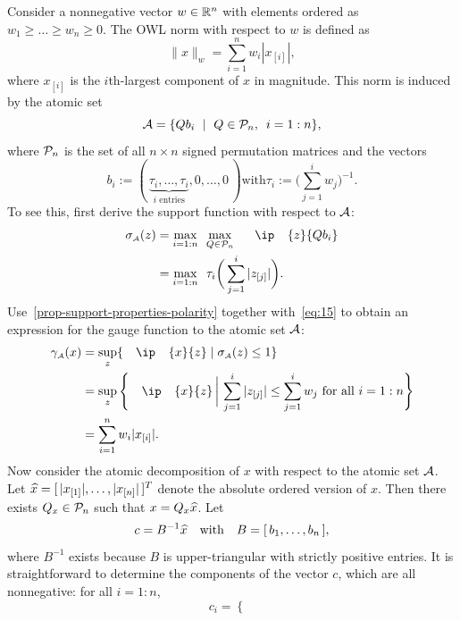 \begin{example}
  Consider a nonnegative vector $w \in \mathbb{R}^n$ with elements ordered as $w_1
  \geq \dots \geq w_n \geq 0$. The OWL norm with respect to $w$ is defined as 
  \begin{equation*}
    \|x\|_w = \sum_{i = 1}^n w_i|x_{[i]}|,
  \end{equation*}
  where $x_{[i]}$ is the $i$th-largest component of $x$ in magnitude. This norm
  is induced by the atomic set 
  \[
    \mathcal{A} = \{Qb_i ~\mid~ Q \in \mathcal{P}_n, \enspace i = 1:n\},
  \]
  where $\mathcal{P}_n$ is the set of all $n\times n$ signed permutation matrices and
  the vectors
  \[
    b_i :=
    (\,\underbrace{\tau_i, \dots, \tau_i}_{\mbox{$i$ entries}}, 0, \dots, 0\,)
    \text{with}
    \tau_i := \bigg(\sum_{j = 1}^i w_j\bigg)^{-1}.
  \]
  To see this, first derive the support function with respect to $\mathcal{A}$:
  \begin{align*}
    \sigma\As(z) &= \max_{i = 1:n}\enspace\max_{Q \in \Pscr_n}\enspace\ip{z}{Qb_i}
    \\&= \max_{i = 1:n}\enspace\tau_i\bigg(\sum_{j = 1}^i |z_{[j]}| \bigg).
  \end{align*}
  Use~\autoref{prop-support-properties-polarity} together with~\eqref{eq:15} to
  obtain an expression for the gauge function to the atomic set $\mathcal{A}$: 
  \begin{align*}
    \gauge\As(x)
      &= \sup_z\{\ip{x}{z} \mid \sigma\As(z) \leq 1\}
    \\&=  \sup_z\Bigg\{
            \ip{x}{z} \,\bigg\vert\, \sum_{j = 1}^i |z_{[j]}| \leq \sum_{j = 1}^i w_j \mbox{ for all } i=1:n
            \Bigg\}
    \\&= \sum_{i = 1}^n w_i|x_{[i]}|.
  \end{align*}
  Now consider the atomic decomposition of $x$ with respect to the atomic set
  $\mathcal{A}$. Let $\xhat = [\,|x_{[1]}|, \dots, |x_{[n]}|\,]^T$ denote the absolute
  ordered version of $x$. Then there exists $Q_x \in \mathcal{P}_n$ such that $x =
  Q_x\xhat$. Let
  \[
    c = B^{-1}\xhat \text{with} B = [\,b_1, \dots, b_n\,],
  \]
  where $B^{-1}$ exists because $B$ is upper-triangular with strictly positive
  entries. It is straightforward to determine the components of the vector $c$,
  which are all nonnegative: for all $i=1:n$,
  \begin{equation} \label{eq:ci-defn}
    c_i =
    \begin{cases}

\end{cases}
\end{equation}
\end{example}
